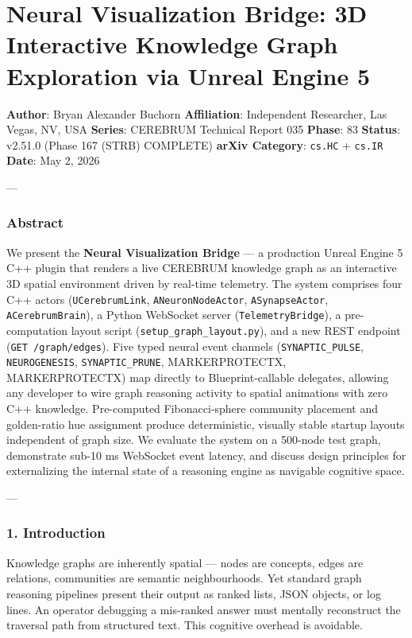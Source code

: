 \section{Neural Visual\-ization Bridge: 3D Interactive Knowledge Graph Exploration via Unreal Engine 5}

\textbf{Author}: Bryan Alexander Buchorn  
\textbf{Affiliation}: Independent Researcher, Las Vegas, NV, USA  
\textbf{Series}: CEREBRUM Technical Report 035  
\textbf{Phase}: 83  
\textbf{Status}: v2.51.0 (Phase 167 (STRB) COMPLETE)
\textbf{arXiv Category}: \texttt{cs.HC} + \texttt{cs.IR}  
\textbf{Date}: May 2, 2026

---

\subsubsection{Abstract}

We present the \textbf{Neural Visual\-ization Bridge} — a production Unreal Engine 5 C++ plugin that renders a live CEREBRUM knowledge graph as an interactive 3D spatial environment driven by real-time telemetry. The system comprises four C++ actors (\texttt{UCerebrumLink}, \texttt{ANeuronNodeActor}, \texttt{ASynapseActor}, \texttt{ACerebrumBrain}), a Python WebSocket server (\texttt{TelemetryBridge}), a pre-computation layout script (\texttt{setup\_graph\_layout.py}), and a new REST endpoint (\texttt{GET /graph/edges}). Five typed neural event channels (\texttt{SYNAPTIC\_PULSE}, \texttt{NEUROGENESIS}, \texttt{SYNAPTIC\_PRUNE}, MARKERPROTECT\-X, MARKERPROTECT\-X) map directly to Blueprint-callable delegates, allowing any developer to wire graph reasoning activity to spatial animations with zero C++ knowledge. Pre-computed Fibonacci-sphere community placement and golden-ratio hue assignment produce deter\-ministic, visually stable startup layouts independent of graph size. We evaluate the system on a 500-node test graph, demonstrate sub-10 ms WebSocket event latency, and discuss design principles for exter\-nalizing the internal state of a reasoning engine as navigable cognitive space.

---

\subsubsection{1. Introd\-uction}

Knowledge graphs are inherently spatial — nodes are concepts, edges are relations, communities are semantic neigh\-bourhoods. Yet standard graph reasoning pipelines present their output as ranked lists, JSON objects, or log lines. An operator debugging a mis-ranked answer must mentally reconstruct the traversal path from structured text. This cognitive overhead is avoidable.

